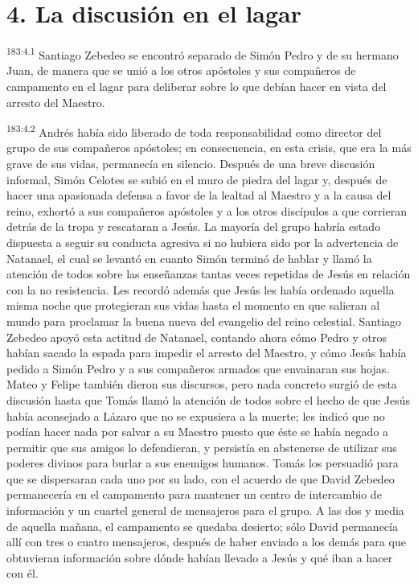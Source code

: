 \section*{4. La discusión en el lagar}
\par 
\textsuperscript{183:4.1} Santiago Zebedeo se encontró separado de Simón Pedro y de su hermano Juan, de manera que se unió a los otros apóstoles y sus compañeros de campamento en el lagar para deliberar sobre lo que debían hacer en vista del arresto del Maestro.

\par 
\textsuperscript{183:4.2} Andrés había sido liberado de toda responsabilidad como director del grupo de sus compañeros apóstoles; en consecuencia, en esta crisis, que era la más grave de sus vidas, permanecía en silencio. Después de una breve discusión informal, Simón Celotes se subió en el muro de piedra del lagar y, después de hacer una apasionada defensa a favor de la lealtad al Maestro y a la causa del reino, exhortó a sus compañeros apóstoles y a los otros discípulos a que corrieran detrás de la tropa y rescataran a Jesús. La mayoría del grupo habría estado dispuesta a seguir su conducta agresiva si no hubiera sido por la advertencia de Natanael, el cual se levantó en cuanto Simón terminó de hablar y llamó la atención de todos sobre las enseñanzas tantas veces repetidas de Jesús en relación con la no resistencia. Les recordó además que Jesús les había ordenado aquella misma noche que protegieran sus vidas hasta el momento en que salieran al mundo para proclamar la buena nueva del evangelio del reino celestial. Santiago Zebedeo apoyó esta actitud de Natanael, contando ahora cómo Pedro y otros habían sacado la espada para impedir el arresto del Maestro, y cómo Jesús había pedido a Simón Pedro y a sus compañeros armados que envainaran sus hojas. Mateo y Felipe también dieron sus discursos, pero nada concreto surgió de esta discusión hasta que Tomás llamó la atención de todos sobre el hecho de que Jesús había aconsejado a Lázaro que no se expusiera a la muerte; les indicó que no podían hacer nada por salvar a su Maestro puesto que éste se había negado a permitir que sus amigos lo defendieran, y persistía en abstenerse de utilizar sus poderes divinos para burlar a sus enemigos humanos. Tomás los persuadió para que se dispersaran cada uno por su lado, con el acuerdo de que David Zebedeo permanecería en el campamento para mantener un centro de intercambio de información y un cuartel general de mensajeros para el grupo. A las dos y media de aquella mañana, el campamento se quedaba desierto; sólo David permanecía allí con tres o cuatro mensajeros, después de haber enviado a los demás para que obtuvieran información sobre dónde habían llevado a Jesús y qué iban a hacer con él.

